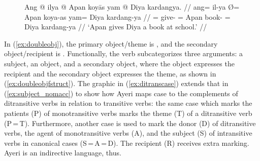 \begin{figure}
\pex\label{ex:doubleobj}
\a\label{ex:doubleobj_1}\begingl
	\gla Ang @ ilya {} @ Apan koyās yam @ Diya kardangya. //
	\glb ang= il-ya Ø= Apan koya-as yam= Diya kardang-ya //
	\glc \AgtT{}= give-\TsgM{} \Top{}= Apan book-\Parg{} \Dat{}= Diya
	kardang-ya //
	\glft `Apan gives Diya a book at school.' //
\endgl

\a\label{ex:doubleobj_2}\ljudge*%
\xe
\end{figure}

In (\ref{ex:doubleobj}), the primary object/theme is , and the secondary object/re\-cip\-i\-ent is . Functionally, the verb
subcategorizes three arguments: a subject, an object, and a secondary object,
where the object expresses the recipient and the secondary object expresses the
theme, as shown in (\ref{ex:doubleobjfstruct}). The graphic in
(\ref{ex:ditranscase}) extends that in (\ref{ex:subject_nomacc}) to show how
Ayeri maps case to the complements of ditransitive verbs in relation to
transitive verbs: the same case which marks the patients (P) of monotransitive
verbs marks the theme (T) of a ditransitive verb (P\,=\,T). Furthermore,
another case is used to mark the donor (D) of ditransitive verbs, the agent of
monotransitive verbs (A), and the subject (S) of intransitive verbs in
canonical cases (S\,=\,A\,=\,D). The recipient (R) receives extra marking.
Ayeri is an indirective language, thus.

